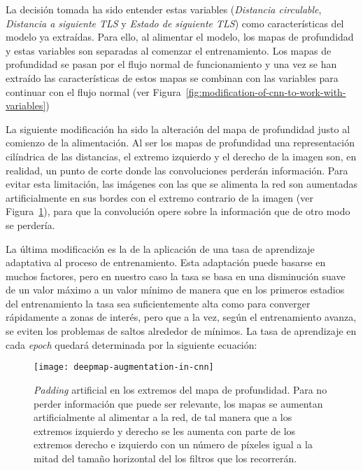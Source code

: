 La decisión tomada ha sido entender estas variables (\textit{Distancia circulable}, \textit{Distancia a siguiente TLS} y \textit{Estado de siguiente TLS}) como características del modelo ya extraídas. Para ello, al alimentar el modelo, los mapas de profundidad y estas variables son separadas al comenzar el entrenamiento. Los mapas de profundidad se pasan por el flujo normal de funcionamiento y una vez se han extraído las características de estos mapas se combinan con las variables para continuar con el flujo normal (ver Figura~\ref{fig:modification-of-cnn-to-work-with-variables})

La siguiente modificación ha sido la alteración del mapa de profundidad justo al comienzo de la alimentación. Al ser los mapas de profundidad una representación cilíndrica de las distancias, el extremo izquierdo y el derecho de la imagen son, en realidad, un punto de corte donde las convoluciones perderán información. Para evitar esta limitación, las imágenes con las que se alimenta la red son aumentadas artificialmente en sus bordes con el extremo contrario de la imagen (ver Figura~\ref{fig:deepmap-augmentation-in-cnn}), para que la convolución opere sobre la información que de otro modo se perdería.

La última modificación es la de la aplicación de una tasa de aprendizaje adaptativa al proceso de entrenamiento. Esta adaptación puede basarse en muchos factores, pero en nuestro caso la tasa se basa en una disminución suave de un valor máximo a un valor mínimo de manera que en los primeros estadios del entrenamiento la tasa sea suficientemente alta como para converger rápidamente a zonas de interés, pero que a la vez, según el entrenamiento avanza, se eviten los problemas de saltos alrededor de mínimos. La tasa de aprendizaje en cada \textit{epoch} quedará determinada por la siguiente ecuación:

\begin{figure}[t]
	\centering
	\texttt{[image: deepmap-augmentation-in-cnn]}
	\caption[\textit{Padding} artificial en los extremos del mapa de profundidad]{\textit{Padding} artificial en los extremos del mapa de profundidad. Para no perder información que puede ser relevante, los mapas se aumentan artificialmente al alimentar a la red, de tal manera que a los extremos izquierdo y derecho se les aumenta con parte de los extremos derecho e izquierdo con un número de píxeles igual a la mitad del tamaño horizontal del los filtros que los recorrerán.}
	\label{fig:deepmap-augmentation-in-cnn}
\end{figure}

